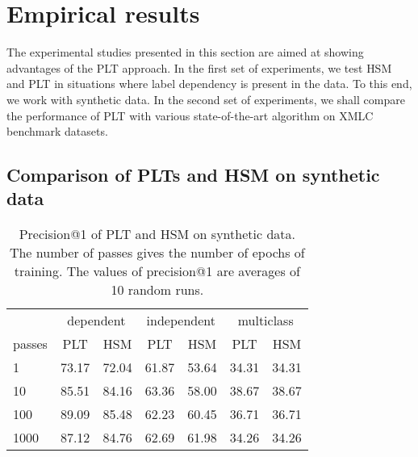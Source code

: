 \documentclass{article}
\newcommand{\Algo}[1]{\textsc{#1}}
\newcommand{\sectionBefore}{-0pt}
\newcommand{\sectionAfter}{-0pt}
\begin{document}
\vspace{\sectionBefore}
\section{Empirical results}
\label{sec:empirical_results}
\vspace{\sectionAfter}

The experimental studies presented in this section are aimed at showing advantages of the PLT approach. In the first set of experiments, we test \Algo{HSM} and \Algo{PLT} in situations where label dependency is present in the data. To this end, we work with synthetic data. In the second set of experiments, we shall compare the performance of PLT with various state-of-the-art algorithm on XMLC benchmark datasets.


\subsection{Comparison of PLTs and HSM on synthetic data}
\label{sec:empirical-synthetic}

\begin{table}[]
	\centering
	\caption{Precision@1 of PLT and HSM on synthetic data. The number of passes gives the number of epochs of training. The values of precision@1 are averages of 10 random runs.}
	\label{tab:synthetic1}
\begin{tabular}{l|rr|rr|rr}
	\toprule
	 & \multicolumn{2}{c|}{dependent}                     & \multicolumn{2}{c|}{independent}                   & \multicolumn{2}{c}{multiclass}                    \\
	 passes & \multicolumn{1}{c}{PLT} & \multicolumn{1}{c|}{HSM} & \multicolumn{1}{c}{PLT} & \multicolumn{1}{c|}{HSM} & \multicolumn{1}{c}{PLT} & \multicolumn{1}{c}{HSM} \\
	\midrule
	1      & 73.17 & 72.04 & 61.87    & 53.64 & 34.31  & 34.31  \\
	10     & 85.51 & 84.16 & 63.36    & 58.00 & 38.67  & 38.67  \\
	100    & 89.09 & 85.48 & 62.23    & 60.45 & 36.71  & 36.71  \\
	1000   & 87.12 & 84.76 & 62.69    & 61.98 & 34.26  & 34.26 \\
	\bottomrule
\end{tabular}
\vspace{-0.4cm}
\end{table}
\end{document}
